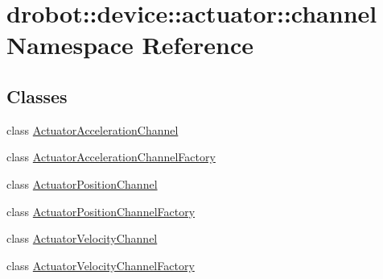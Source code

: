 \hypertarget{namespacedrobot_1_1device_1_1actuator_1_1channel}{\section{drobot\-:\-:device\-:\-:actuator\-:\-:channel Namespace Reference}
\label{namespacedrobot_1_1device_1_1actuator_1_1channel}
}
\subsection*{Classes}
\begin{DoxyCompactItemize}
\item 
class \hyperlink{classdrobot_1_1device_1_1actuator_1_1channel_1_1ActuatorAccelerationChannel}{Actuator\-Acceleration\-Channel}
\item 
class \hyperlink{classdrobot_1_1device_1_1actuator_1_1channel_1_1ActuatorAccelerationChannelFactory}{Actuator\-Acceleration\-Channel\-Factory}
\item 
class \hyperlink{classdrobot_1_1device_1_1actuator_1_1channel_1_1ActuatorPositionChannel}{Actuator\-Position\-Channel}
\item 
class \hyperlink{classdrobot_1_1device_1_1actuator_1_1channel_1_1ActuatorPositionChannelFactory}{Actuator\-Position\-Channel\-Factory}
\item 
class \hyperlink{classdrobot_1_1device_1_1actuator_1_1channel_1_1ActuatorVelocityChannel}{Actuator\-Velocity\-Channel}
\item 
class \hyperlink{classdrobot_1_1device_1_1actuator_1_1channel_1_1ActuatorVelocityChannelFactory}{Actuator\-Velocity\-Channel\-Factory}
\end{DoxyCompactItemize}
